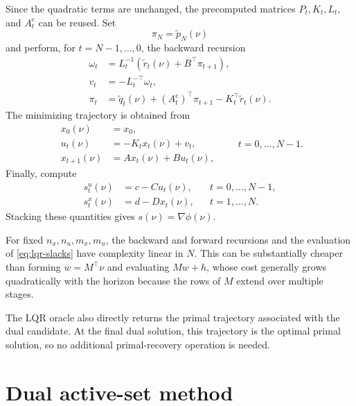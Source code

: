 \documentclass[11pt]{article}
\begin{document}
Since the quadratic terms are unchanged, the precomputed matrices
\(P_t,K_t,L_t\), and \(A_t^{\mathrm c}\) can be reused. Set
\begin{equation}
\pi_N=\widetilde p_N(\nu)
\end{equation}
and perform, for \(t=N-1,\ldots,0\), the backward recursion
\begin{equation}
\begin{aligned}
\omega_t
&=L_t^{-1}\left(
 \widetilde r_t(\nu)+B^\top\pi_{t+1}
 \right),\\
v_t
&=-L_t^{-\top}\omega_t,\\
\pi_t
&=\widetilde q_t(\nu)
 +(A_t^{\mathrm c})^\top\pi_{t+1}
 -K_t^\top\widetilde r_t(\nu).
\end{aligned}
\label{eq:dual-lqr-backward}
\end{equation}
The minimizing trajectory is obtained from
\begin{equation}
\begin{aligned}
x_0(\nu)&=x_0,\\
u_t(\nu)&=-K_tx_t(\nu)+v_t,\\
x_{t+1}(\nu)&=Ax_t(\nu)+Bu_t(\nu),
\end{aligned}
\qquad t=0,\ldots,N-1.
\label{eq:dual-lqr-forward}
\end{equation}
Finally, compute
\begin{equation}
\begin{aligned}
s_t^u(\nu)&=c-Cu_t(\nu),
&&t=0,\ldots,N-1,\\
s_t^x(\nu)&=d-Dx_t(\nu),
&&t=1,\ldots,N.
\end{aligned}
\label{eq:lqr-slacks}
\end{equation}
Stacking these quantities gives \(s(\nu)=\nabla\phi(\nu)\).

For fixed \(n_x,n_u,m_x,m_u\), the backward and forward recursions
and the evaluation of \eqref{eq:lqr-slacks} have complexity linear in
\(N\). This can be substantially cheaper than forming
\(w=M^\top\nu\) and evaluating \(Mw+h\), whose cost generally grows
quadratically with the horizon because the rows of \(M\) extend over
multiple stages.

The LQR oracle also directly returns the primal trajectory associated
with the dual candidate. At the final dual solution, this trajectory
is the optimal primal solution, so no additional primal-recovery
operation is needed.

\section{Dual active-set method}
\end{document}
